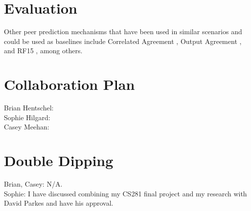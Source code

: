 \documentclass[a4paper, 11pt]{article}
\begin{document}
\section{Evaluation}
Other peer prediction mechanisms that have been used in similar scenarios and could be used as baselines include Correlated Agreement \citep{shnayder2016informed}, Output Agreement \citep{von2004labeling}, and RF15 \citep{radanovic2015incentive}, among others.

\section{Collaboration Plan}
Brian Hentschel: \\
Sophie Hilgard: \\
Casey Meehan:

\section{Double Dipping}
Brian, Casey: N/A. \\
Sophie: I have discussed combining my CS281 final project and my research with David Parkes and have his approval.



\end{document}
